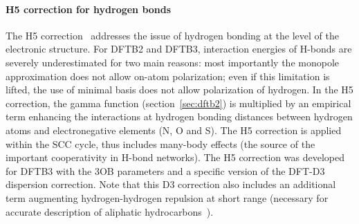\documentclass[reprint,onecolumn,superscriptaddress]{revtex4-1}
\begin{document}
\paragraph{H5 correction for hydrogen bonds}

The H5 correction~\cite{rezac2017} addresses the issue of hydrogen bonding at
the level of the electronic structure.  For DFTB2 and DFTB3, interaction
energies of H-bonds are severely underestimated for two main reasons: most
importantly the monopole approximation does not allow on-atom polarization; even
if this limitation is lifted, the use of minimal basis does not allow
polarization of hydrogen.  In the H5 correction, the gamma function
(section~\ref{sec:dftb2}) is multiplied by an empirical term enhancing the
interactions at hydrogen bonding distances between hydrogen atoms and
electronegative elements (N, O and S). The H5 correction is applied within the
SCC cycle, thus includes many-body effects (the source of the important
cooperativity in H-bond networks).
The H5 correction was developed for DFTB3 with the 3OB parameters and a specific
version of the DFT-D3~\cite{grimme2010,grimme2011} dispersion correction. Note
that this D3 correction also includes an additional term augmenting
hydrogen-hydrogen repulsion at short range (necessary for accurate description
of aliphatic hydrocarbons~\cite{rezac_2012,vorlova_2015}).
\end{document}
